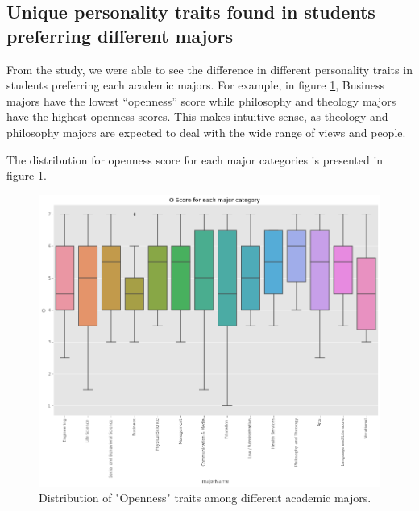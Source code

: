 \documentclass[conference]{IEEEtran}
\begin{document}
\subsection{Unique personality traits found in students preferring different majors}\label{subsec4}
From the study, we were able to see the difference in different personality traits
in students preferring each academic majors. For example, in figure \ref{fig:score_o}, Business
majors have the lowest “openness” score while philosophy and theology majors have
the highest openness scores. This makes intuitive sense, as theology and philosophy
majors are expected to deal with the wide range of views and people. 




  The distribution for openness score for each major categories is presented in figure \ref{fig:score_o}. 

\begin{figure}[h]
\includegraphics[scale=0.28]{figs/score_o.png}
\caption{Distribution of "Openness" traits among different academic majors.}
\label{fig:score_o}
\centering
\end{figure}
\end{document}
